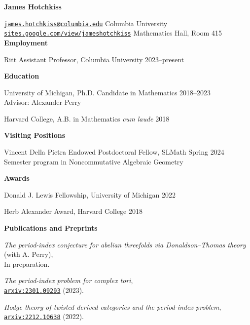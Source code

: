 \documentclass[11 pt]{letter}
\begin{document}
	\noindent
	\begin{center}
	 	\textbf{\Large James Hotchkiss}
	 \end{center} 
	\hrulefill 

	\noindent \href{mailto:james.hotchkiss@columbia.edu}{\nolinkurl{james.hotchkiss@columbia.edu}} \hfill Columbia University \\
	\href{https://sites.google.com/view/jameshotchkiss/james-hotchkiss}{\nolinkurl{sites.google.com/view/jameshotchkiss}}  \hfill Mathematics Hall, Room 415 \\



	\noindent
	\textbf{\large{Employment}}

	Ritt Assistant Professor, Columbia University \hfill 2023--present


	\noindent
	\textbf{\large{Education}}

	University of Michigan, Ph.D. Candidate in Mathematics \hfill 2018--2023 \\
	\indent Advisor: Alexander Perry

	Harvard College, A.B. in Mathematics \textit{cum laude} \hfill 2018

	\noindent
	\textbf{\large{Visiting Positions}}

	Vincent Della Pietra Endowed Postdoctoral Fellow, SLMath \hfill Spring 2024 \\
	\indent Semester program in Noncommutative Algebraic Geometry

	\medskip
	\noindent
	\textbf{\large{Awards}}

	Donald J. Lewis Fellowship, University of Michigan \hfill 2022 

	Herb Alexander Award, Harvard College \hfill 2018


	\medskip
	\noindent
	\textbf{\large{Publications and Preprints}}

	\emph{The period-index conjecture for abelian threefolds via Donaldson--Thomas theory} \\ \indent (with A. Perry), \\
	\indent In preparation. 

	\emph{The period-index problem for complex tori}, \\
	\indent \href{https://arxiv.org/abs/2301.09293}{\nolinkurl{arxiv:2301.09293}} (2023).

	\emph{Hodge theory of twisted derived categories and the period-index problem}, \\ 
	\indent \href{https://arxiv.org/abs/2212.10638}{\nolinkurl{arxiv:2212.10638}} (2022).
\end{document}

